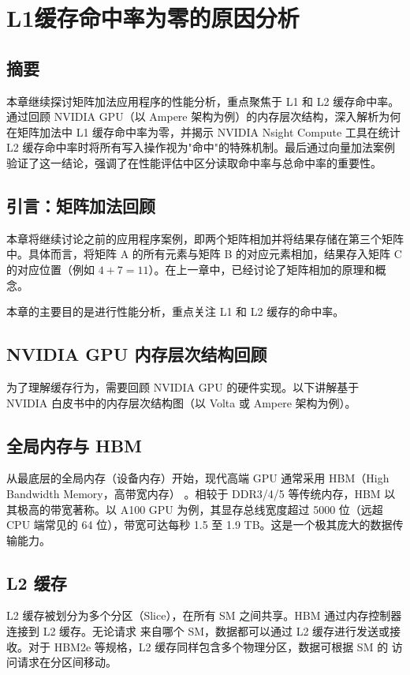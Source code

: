 \section{L1缓存命中率为零的原因分析}

\subsection*{摘要}
本章继续探讨矩阵加法应用程序的性能分析，重点聚焦于 L1 和 L2 缓存命中率。通过回顾 NVIDIA GPU（以 Ampere 架构为例）的内存层次结构，深入解析为何在矩阵加法中 L1 缓存命中率为零，并揭示 NVIDIA Nsight Compute 工具在统计 L2 缓存命中率时将所有写入操作视为"命中"的特殊机制。最后通过向量加法案例验证了这一结论，强调了在性能评估中区分读取命中率与总命中率的重要性。

\subsection{引言：矩阵加法回顾}
本章将继续讨论之前的应用程序案例，即两个矩阵相加并将结果存储在第三个矩阵中。具体而言，将矩阵 A 的所有元素与矩阵 B 的对应元素相加，结果存入矩阵 C 的对应位置（例如 $4+7=11$）。在上一章中，已经讨论了矩阵相加的原理和概念。

本章的主要目的是进行性能分析，重点关注 L1 和 L2 缓存的命中率。

\subsection{NVIDIA GPU 内存层次结构回顾}
为了理解缓存行为，需要回顾 NVIDIA GPU 的硬件实现。以下讲解基于 NVIDIA 白皮书中的内存层次结构图（以 Volta 或 Ampere 架构为例）。


\subsection{全局内存与 HBM}
从最底层的全局内存（设备内存）开始，现代高端 GPU 通常采用 HBM（High Bandwidth Memory，高带宽内存）
。相较于 DDR3/4/5 等传统内存，HBM 以其极高的带宽著称。以 A100 GPU 为例，其显存总线宽度超过 5000 位（远超 CPU 端常见的 64 位），带宽可达每秒 1.5 至 1.9 TB。这是一个极其庞大的数据传输能力。


\subsection{L2 缓存}
L2 缓存被划分为多个分区（Slice），在所有 SM 之间共享。HBM 通过内存控制器连接到 L2 缓存。无论请求
来自哪个 SM，数据都可以通过 L2 缓存进行发送或接收。对于 HBM2e 等规格，L2 缓存同样包含多个物理分区，数据可根据 SM 的
访问请求在分区间移动。

